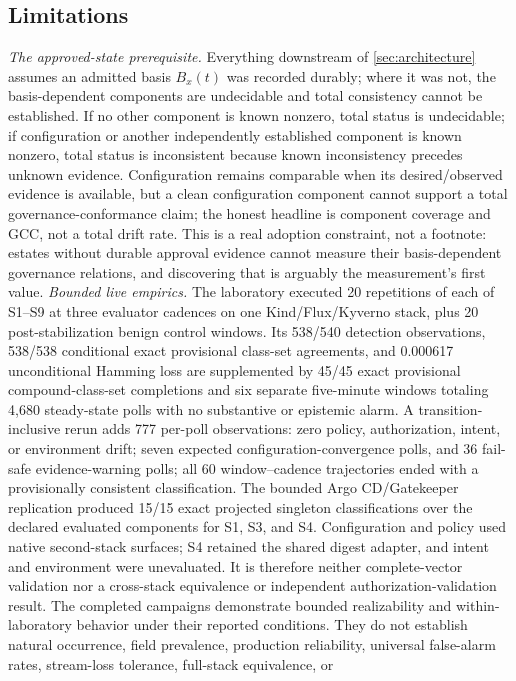 \subsection{Limitations}
\emph{The approved-state prerequisite.} Everything downstream of
\cref{sec:architecture} assumes an admitted basis $B_x(t)$ was recorded durably; where it was
not, the basis-dependent components are undecidable and total consistency
cannot be established. If no other component is known nonzero, total status is
undecidable; if configuration or another independently established component
is known nonzero, total status is inconsistent because known inconsistency
precedes unknown evidence. Configuration remains comparable when its
desired/observed evidence is available, but a clean configuration component
cannot support a total governance-conformance claim; the honest headline is
component coverage and GCC, not a total drift rate. This is a real adoption constraint, not a footnote: estates without
durable approval evidence cannot measure their basis-dependent governance
relations, and discovering that is arguably the measurement's first value.
\emph{Bounded live empirics.} The laboratory executed 20 repetitions of each
of S1--S9 at three evaluator cadences on one Kind/Flux/Kyverno stack, plus 20
post-stabilization benign control windows. Its 538/540 detection observations,
538/538 conditional exact provisional class-set agreements, and 0.000617
unconditional Hamming loss are supplemented by 45/45 exact provisional
compound-class-set completions and six separate
five-minute windows totaling 4,680 steady-state polls with no substantive or
epistemic alarm. A transition-inclusive rerun adds 777 per-poll observations:
zero policy, authorization, intent, or environment drift; seven expected configuration-convergence
polls, and 36 fail-safe evidence-warning polls; all 60 window--cadence
trajectories ended with a provisionally consistent classification.
The bounded Argo CD/Gatekeeper replication produced 15/15 exact projected
singleton classifications over the declared evaluated components for S1, S3,
and S4. Configuration and policy used native second-stack surfaces; S4 retained
the shared digest adapter, and intent and environment were unevaluated. It is
therefore neither complete-vector validation nor a cross-stack equivalence or
independent authorization-validation result. The completed campaigns demonstrate
bounded realizability and within-laboratory behavior under their reported
conditions. They do not
establish natural occurrence, field prevalence, production reliability,
universal false-alarm rates, stream-loss tolerance, full-stack equivalence, or
